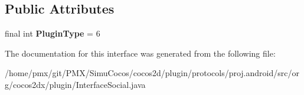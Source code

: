 \subsection*{Public Attributes}
\begin{DoxyCompactItemize}
\item 
\mbox{\label{interfaceorg_1_1cocos2dx_1_1plugin_1_1InterfaceSocial_ac38563f63ebba28c178b776842753f87}} 
final int {\bfseries Plugin\+Type} = 6
\end{DoxyCompactItemize}


The documentation for this interface was generated from the following file\+:\begin{DoxyCompactItemize}
\item 
/home/pmx/git/\+P\+M\+X/\+Simu\+Cocos/cocos2d/plugin/protocols/proj.\+android/src/org/cocos2dx/plugin/Interface\+Social.\+java\end{DoxyCompactItemize}
